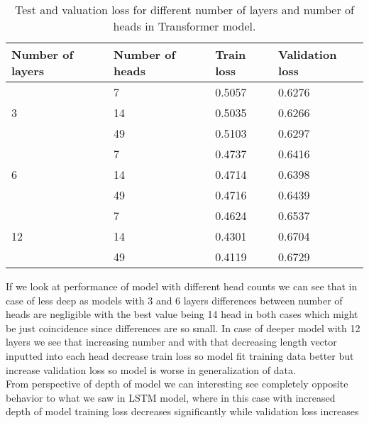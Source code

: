 \begin{table}[]
	\centering
	\begin{tabular}{|l|l|l|l|}
		\hline
		Number of layers    & Number of heads & Train loss & Validation loss \\ \hline
		\multirow{3}{*}{3}  & 7        &  0.5057         &  0.6276               \\ \cline{2-4} 
		& 14              &  0.5035         &  0.6266               \\ \cline{2-4} 
		& 49              &  0.5103         &  0.6297               \\ \hline
		\multirow{3}{*}{6}  & 7       & 0.4737          &  0.6416               \\ \cline{2-4} 
		& 14              &  0.4714         &  0.6398               \\ \cline{2-4} 
		& 49              &  0.4716         &  0.6439               \\ \hline
		\multirow{3}{*}{12} & 7       & 0.4624          & 0.6537                \\ \cline{2-4} 
		& 14              & 0.4301          &  0.6704               \\ \cline{2-4} 
		& 49              & 0.4119          &  0.6729               \\ \hline
	\end{tabular}
	\caption{Test and valuation loss for different number of layers and number of heads in Transformer model.}
	\label{tab:transformer_train}
\end{table}

If we look at performance of model with different head counts we can see that in case of less deep as models with 3 and 6 layers differences between number of heads are negligible with the best value being 14 head in both cases which might be just coincidence since differences are so small. In case of deeper model with 12 layers we see that increasing number and with that decreasing length vector inputted into each head decrease train loss so model fit training data better but increase validation loss so model is worse in generalization of data.
\\

From perspective of depth of model we can interesting see completely opposite behavior to what we saw in LSTM model, where in this case with increased depth of model training loss decreases significantly while validation loss increases

